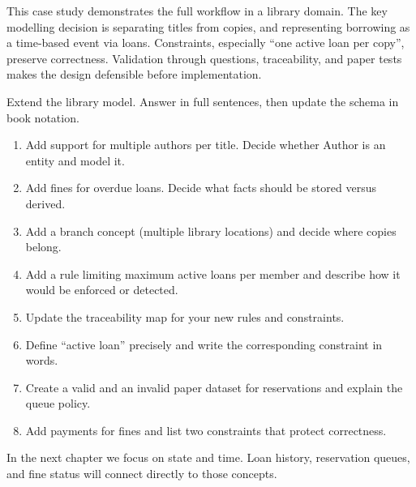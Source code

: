 \begin{chaptersummary}
This case study demonstrates the full workflow in a library domain.
The key modelling decision is separating titles from copies, and representing borrowing as a time-based event via loans.
Constraints, especially “one active loan per copy”, preserve correctness.
Validation through questions, traceability, and paper tests makes the design defensible before implementation.
\end{chaptersummary}

\begin{exercisebox}
Extend the library model.
Answer in full sentences, then update the schema in book notation.
\begin{enumerate}[label=\arabic*.]
  \item Add support for multiple authors per title. Decide whether Author is an entity and model it.
  \item Add fines for overdue loans. Decide what facts should be stored versus derived.
  \item Add a branch concept (multiple library locations) and decide where copies belong.
  \item Add a rule limiting maximum active loans per member and describe how it would be enforced or detected.
  \item Update the traceability map for your new rules and constraints.
  \item Define “active loan” precisely and write the corresponding constraint in words.
  \item Create a valid and an invalid paper dataset for reservations and explain the queue policy.
  \item Add payments for fines and list two constraints that protect correctness.
\end{enumerate}
\end{exercisebox}

In the next chapter we focus on state and time.
Loan history, reservation queues, and fine status will connect directly to those concepts.
